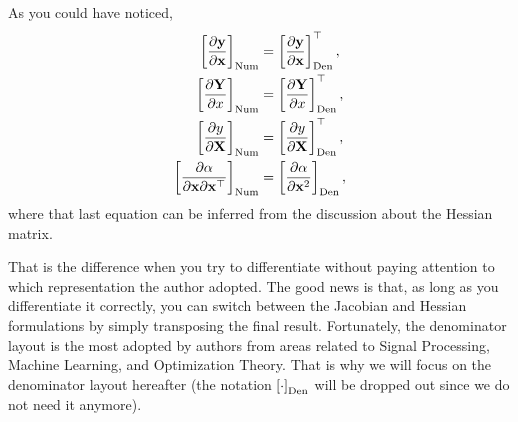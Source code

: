 \documentclass{article}
\newcommand{\trans}{\top}
\begin{document}
As you could have noticed,
\begin{align}
    \left[ \dfrac{\partial \mathbf{y}}{\partial \mathbf{x}} \right]_{\textnormal{Num}} & = \left[ \dfrac{\partial \mathbf{y}}{\partial \mathbf{x}} \right]_{\textnormal{Den}}^{\trans}, \\
    \left[ \dfrac{\partial \mathbf{Y}}{\partial x}\right]_{\textnormal{Num}} & = \left[ \dfrac{\partial \mathbf{Y}}{\partial x}\right]_{\textnormal{Den}}^{\trans}, \\
    \left[\dfrac{\partial y}{\partial \mathbf{X}}\right]_{\textnormal{Num}} & = \left[\dfrac{\partial y}{\partial \mathbf{X}}\right]_{\textnormal{Den}}^{\trans}, \\
    \left[\dfrac{\partial \alpha}{\partial \mathbf{x} \partial\mathbf{x}^\top}\right]_{\textnormal{Num}} & = \left[\dfrac{\partial \alpha}{\partial \mathbf{x}^{2}}\right]_{\textnormal{Den}},
\end{align}
where that last equation can be inferred from the discussion about the Hessian matrix.

That is the difference when you try to differentiate without paying attention to which representation the author adopted. The good news is that, as long as you differentiate it correctly, you can switch between the Jacobian and Hessian formulations by simply transposing the final result. Fortunately, the denominator layout is the most adopted by authors from areas related to Signal Processing, Machine Learning, and Optimization Theory. That is why we will focus on the denominator layout hereafter (the notation \(\left[\cdot\right]_{\textnormal{Den}}\) will be dropped out since we do not need it anymore). %
\end{document}

